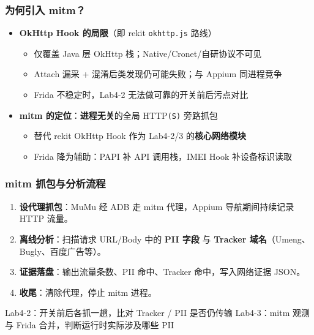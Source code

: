 \documentclass[AutoFakeBold,AutoFakeSlant]{beamer}
\newcommand{\sepbar}{\quad\textbar\quad}
\begin{document}
\begin{frame}
    \frametitle{为何引入 mitm？}
    \small
    \begin{itemize}
        \item \textbf{OkHttp Hook 的局限}（即 rekit \texttt{okhttp.js} 路线）
        \begin{itemize}
            \item 仅覆盖 Java 层 OkHttp 栈；Native/Cronet/自研协议不可见
            \item Attach 漏采 + 混淆后类发现仍可能失败；与 Appium 同进程竞争
            \item Frida 不稳定时，Lab4-2 无法做可靠的开关前后污点对比
        \end{itemize}
        \item \textbf{mitm 的定位}：\textbf{进程无关}的全局 HTTP\texttt{(S)} 旁路抓包
        \begin{itemize}
            \item 替代 rekit OkHttp Hook 作为 Lab4-2/3 的\textbf{核心网络模块}
            \item Frida 降为辅助：PAPI 补 API 调用栈，IMEI Hook 补设备标识读取
        \end{itemize}   
    \end{itemize}
\end{frame}

\begin{frame}
    \frametitle{mitm 抓包与分析流程}
    \small
    \begin{enumerate}
        \item \textbf{设代理抓包}：MuMu 经 ADB 走 mitm 代理，Appium 导航期间持续记录 HTTP 流量。
        \item \textbf{离线分析}：扫描请求 URL/Body 中的 \textbf{PII 字段} 与 \textbf{Tracker 域名}（Umeng、Bugly、百度广告等）。
        \item \textbf{证据落盘}：输出流量条数、PII 命中、Tracker 命中，写入网络证据 JSON。
        \item \textbf{收尾}：清除代理，停止 mitm 进程。
    \end{enumerate}
    \vspace{0.3em}
    \scriptsize
    Lab4-2：开关前后各抓一趟，比对 Tracker / PII 是否仍传输 \sepbar
    Lab4-3：mitm 观测与 Frida 合并，判断运行时实际涉及哪些 PII
\end{frame}
\end{document}
